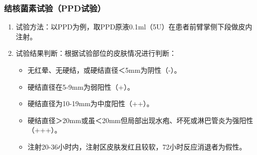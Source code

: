 \documentclass[11pt, a4paper]{ctexart}
\begin{document}
\subsubsection{结核菌素试验（PPD试验）}
\begin{enumerate}
    \item 试验方法：以PPD为例，取PPD原液0.1ml（5U）在患者前臂掌侧下段做皮内注射。
    \item 试验结果判断：根据试验部位的皮肤情况进行判断：
    \begin{itemize}
        \item 无红晕、无硬结，或硬结直径＜5mm为阴性（-）。
        \item 硬结直径在5-9mm为弱阳性（+）。
        \item 硬结直径为10-19mm为中度阳性（++）。
        \item 硬结直径＞20mm或虽＜20mm但局部出现水疱、坏死或淋巴管炎为强阳性（+++）。
        \item 注射20-36小时内，注射区皮肤发红且较软，72小时反应消退者为假性。
    \end{itemize}
\end{enumerate}
\end{document}
